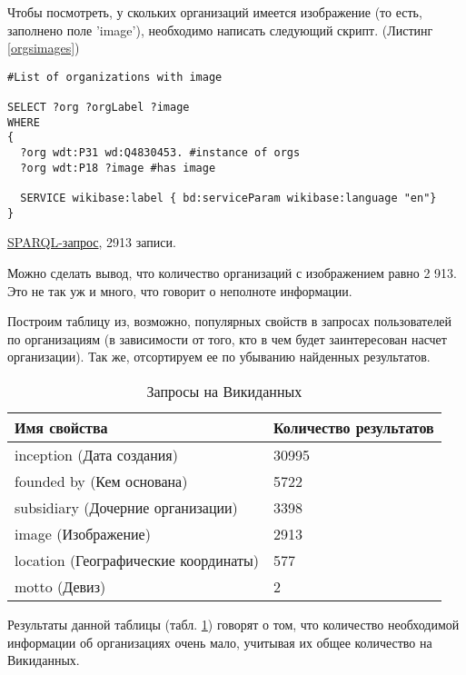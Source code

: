 Чтобы посмотреть, у скольких организаций имеется изображение (то есть, заполнено поле 'image'), необходимо написать следующий скрипт. (Листинг \ref{orgsimages})

\begin{lstlisting}[language=SPARQL,label=orgsimages,caption=Организации с изображением]
#List of organizations with image

SELECT ?org ?orgLabel ?image
WHERE
{
  ?org wdt:P31 wd:Q4830453. #instance of orgs
  ?org wdt:P18 ?image #has image
  
  SERVICE wikibase:label { bd:serviceParam wikibase:language "en"}
}
\end{lstlisting}

\href{https://query.wikidata.org/#%23List%20of%20organisations%20%0A%0ASELECT%20%3Forg%20%3ForgLabel%20%3Fimage%0AWHERE%0A%7B%0A%20%20%3Forg%20wdt%3AP31%20wd%3AQ4830453.%20%23instance%20of%20orgs%0A%20%20%3Forg%20wdt%3AP18%20%3Fimage%0A%20%20%0A%0A%20%20SERVICE%20wikibase%3Alabel%20%7B%20bd%3AserviceParam%20wikibase%3Alanguage%20%22en%22%7D%0A%7D}{SPARQL-запрос}, 2913 записи.

Можно сделать вывод, что количество организаций с изображением равно 2 913. Это не так уж и много, что говорит о неполноте информации.

Построим таблицу из, возможно, популярных свойств в запросах пользователей по организациям (в зависимости от того, кто в чем будет заинтересован насчет организации). Так же, отсортируем ее по убыванию найденных результатов.

\begin{table}[h]
\centering
\begin{tabular}{|l|l|}
\hline
\textbf{Имя свойства} & \textbf{Количество результатов} \\
\hline
inception (Дата создания) & 30995 \\	
\hline
founded by (Кем основана) & 5722 \\
\hline
subsidiary (Дочерние организации) & 3398 \\
\hline
image (Изображение) & 2913 \\
\hline
location (Географические координаты) & 577 \\
\hline
motto (Девиз) & 2 \\
\hline
\end{tabular}
\caption{Запросы на Викиданных}
\label{wdqueries}
\end{table}

Результаты данной таблицы (табл. \ref{wdqueries}) говорят о том, что количество необходимой информации об организациях очень мало, учитывая их общее количество на Викиданных. 

